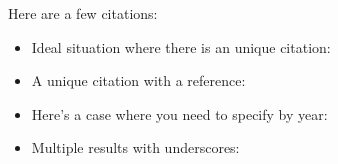 \documentclass{article}
\begin{document}
Here are a few citations:
\begin{itemize}
    \item
        Ideal situation where there is an unique citation:  \cite{stein:iwasawa}
    \item
        A unique citation with a reference: \cite[Prop. 14.2]{mazur:eisenstein}
    \item
        Here's a case where you need to specify by year:
        \cite{mazur:modular:2000}
    \item
        Multiple results with underscores:
        \cite{ribet:galois_real_multiplication}
\end{itemize}
    


\end{document}
